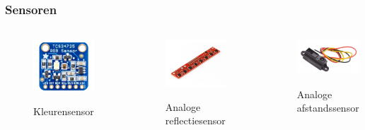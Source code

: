 \documentclass
   [kulak] %
   {kulakbeamer}
\begin{document}
\begin{frame}
	\frametitle{Sensoren}
	\begin{columns}
		\begin{figure}
			\centering
			\includegraphics[width=.7\textwidth]{kleurensensor}
			\caption{Kleurensensor}\cite{TCS34725KleurSensorBOB}
		\end{figure}
		\begin{figure}
			\centering
			\includegraphics[width=.8\textwidth]{reflectiesensor}
			\caption{Analoge reflectiesensor}\cite{QTR-8AAnalogeReflexieSensorArray}
		\end{figure}
		\begin{figure}
			\centering
			\includegraphics[width=.9\textwidth]{afstandssensor}
			\caption{Analoge afstandssensor}\cite{AnalogeAfstandssensor}
		\end{figure}
	\end{columns}
	
\end{frame}
\end{document}
